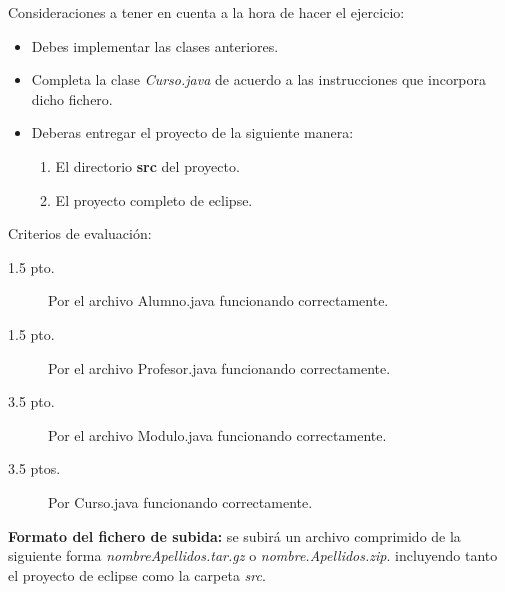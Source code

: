 \documentclass[addpoints,12pt]{exam}
\begin{document}
\begin{questions}
Consideraciones a tener en cuenta a la hora de hacer el ejercicio:
\begin{itemize}
\item Debes implementar las clases anteriores.
\item Completa la clase \emph{Curso.java} de acuerdo a las instrucciones que incorpora dicho fichero.
\item Deberas entregar el proyecto de la siguiente manera:
\begin{enumerate}
\item El directorio \textbf{src} del proyecto.
\item El proyecto completo de eclipse. 
\end{enumerate}
\end{itemize}
Criterios de evaluación:
\begin{description}
\item[1.5 pto.] Por el archivo Alumno.java funcionando correctamente.
\item[1.5 pto.] Por el archivo Profesor.java funcionando correctamente.
\item[3.5 pto.] Por el archivo Modulo.java funcionando correctamente.
\item[3.5 ptos.] Por Curso.java funcionando correctamente.
\end{description}
\textbf{Formato del fichero de subida:} se subirá un archivo comprimido de la siguiente forma \emph{nombreApellidos.tar.gz} o \emph{nombre.Apellidos.zip}. incluyendo tanto el proyecto de eclipse como la carpeta \emph{src}.
\end{questions}
\end{document}
